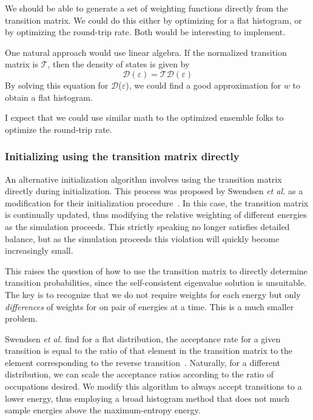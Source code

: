\documentclass[letterpaper,twocolumn,amsmath,amssymb,pre,aps,10pt]{revtex4-1}
\begin{document}
We should be able to generate a set of weighting functions directly
from the transition matrix.  We could do this either by optimizing for
a flat histogram, or by optimizing the round-trip rate.  Both would be
interesting to implement.

One natural approach would use linear algebra.  If the normalized
transition matrix is $\mathcal{T}$, then the density of states is given by
\begin{equation}
  \mathcal{D}(\varepsilon) = \mathcal{T}\mathcal{D}(\varepsilon)
\end{equation}
By solving this equation for $\mathcal{D}$($\varepsilon$), we could find a
good approximation for $w$ to obtain a flat histogram.

I expect that we could use similar math to the optimized ensemble
folks to optimize the round-trip rate.

\subsubsection{Initializing using the transition matrix directly}

An alternative initialization algorithm involves using the transition
matrix directly during initialization.  This process was proposed by
Swendsen \emph{et al.} as a modification for their initialization
procedure~\cite{swendsen1999transition}.  In this case, the transition
matrix is continually updated, thus modifying the relative weighting
of different energies as the simulation proceeds.  This strictly
speaking no longer satisfies detailed balance, but as the simulation
proceeds this violation will quickly become increasingly small.

This raises the question of how to use the transition matrix to
directly determine transition probabilities, since the self-consistent
eigenvalue solution is unsuitable.  The key is to recognize that we do
not require weights for each energy but only \emph{differences} of
weights for on pair of energies at a time.  This is a much smaller
problem.

Swendsen \emph{et al.} find for a flat distribution, the acceptance
rate for a given transition is equal to the ratio of that element in
the transition matrix to the element corresponding to the reverse
transition~\cite{swendsen1999transition}.  Naturally, for a different
distribution, we can scale the acceptance ratios according to the
ratio of occupations desired.  We modify this algorithm to always
accept transitions to a lower energy, thus employing a broad histogram
method that does not much sample energies above the maximum-entropy
energy.
\end{document}
